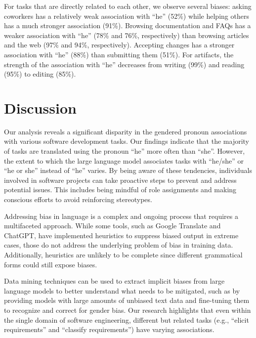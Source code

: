 \documentclass[10pt,conference]{IEEEtran}
\begin{document}
\begin{sloppy}
For tasks that are directly related to each other, we observe several biases: asking coworkers has a relatively weak association with ``he'' (52\%) while helping others has a much stronger association (91\%). Browsing documentation and FAQs has a weaker association with ``he'' (78\% and 76\%, respectively) than browsing articles and the web (97\% and 94\%, respectively). Accepting changes has a stronger association with ``he'' (88\%) than submitting them (51\%). For artifacts, the strength of the association with ``he'' decreases from writing (99\%) and reading (95\%) to editing (85\%).

\section{Discussion}

Our analysis reveals a significant disparity in the gendered pronoun associations with various software development tasks. Our findings indicate that the majority of tasks are translated using the pronoun ``he'' more often than ``she''. However, the extent to which the large language model associates tasks with ``he/she'' or ``he or she'' instead of ``he'' varies. By being aware of these tendencies, individuals involved in software projects can take proactive steps to prevent and address potential issues. This includes being mindful of role assignments and making conscious efforts to avoid reinforcing stereotypes.

Addressing bias in language is a complex and ongoing process that requires a multifaceted approach. While some tools, such as Google Translate and ChatGPT, have implemented heuristics to suppress biased output in extreme cases, those do not address the underlying problem of bias in training data. Additionally, heuristics are unlikely to be complete since different grammatical forms could still expose biases. 

Data mining techniques can be used to extract implicit biases from large language models to better understand what needs to be mitigated, such as by providing models with large amounts of unbiased text data and fine-tuning them to recognize and correct for gender bias. Our research highlights that even within the single domain of software engineering, different but related tasks (e.g., ``elicit requirements'' and ``classify requirements'') have varying associations. 


\end{sloppy}
\end{document}
